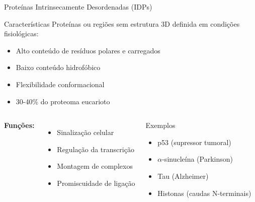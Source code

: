 \begin{frame}[shrink=15]{Proteínas Intrinsecamente Desordenadas (IDPs)}
\begin{block}{Características}
Proteínas ou regiões sem estrutura 3D definida em condições fisiológicas:
\begin{itemize}
    \item Alto conteúdo de resíduos polares e carregados
    \item Baixo conteúdo hidrofóbico
    \item Flexibilidade conformacional
    \item 30-40\% do proteoma eucarioto
\end{itemize}
\end{block}

\vspace{0.3cm}

\begin{columns}
\textbf{Funções:}
\begin{itemize}
    \item Sinalização celular
    \item Regulação da transcrição
    \item Montagem de complexos
    \item Promiscuidade de ligação
\end{itemize}

\begin{exampleblock}{Exemplos}
\begin{itemize}
    \item p53 (supressor tumoral)
    \item $\alpha$-sinucleína (Parkinson)
    \item Tau (Alzheimer)
    \item Histonas (caudas N-terminais)
\end{itemize}
\end{exampleblock}
\end{columns}

\vspace{0.3cm}

\end{frame}

